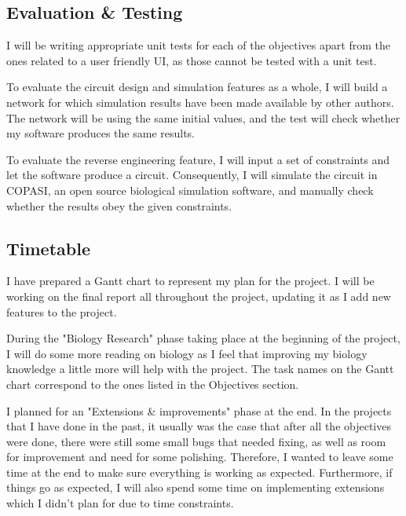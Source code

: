 \documentclass{article}
\begin{document}
	\subsection{Evaluation \& Testing}
	\par I will be writing appropriate unit tests for each of the objectives apart from the ones related to a user friendly UI, as those cannot be tested with a unit test.
	\par To evaluate the circuit design and simulation features as a whole, I will build a network for which simulation results have been made available by other authors. The network will be using the same initial values, and the test will check whether my software produces the same results. 
	\par To evaluate the reverse engineering feature, I will input a set of constraints and let the software produce a circuit. Consequently, I will simulate the circuit in COPASI\cite{copasi}, an open source biological simulation software, and manually check whether the results obey the given constraints.
	
	\subsection{Timetable}
	
	\par I have prepared a Gantt chart to represent my plan for the project. I will be working on the final report all throughout the project, updating it as I add new features to the project. 
	
	\par During the "Biology Research" phase taking place at the beginning of the project, I will do some more reading on biology as I feel that improving my biology knowledge a little more will help with the project. The task names on the Gantt chart correspond to the ones listed in the Objectives section. 
	
	\par I planned for an "Extensions \& improvements" phase at the end. In the projects that I have done in the past, it usually was the case that after all the objectives were done, there were still some small bugs that needed fixing, as well as room for improvement and need for some polishing. Therefore, I wanted to leave some time at the end to make sure everything is working as expected. Furthermore, if things go as expected, I will also spend some time on implementing extensions which I didn't plan for due to time constraints.
	
\end{document}
